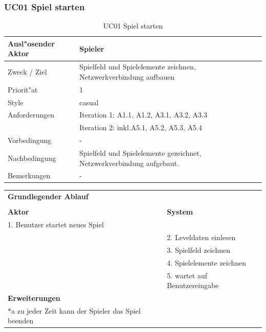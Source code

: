 \subsubsection{UC01 Spiel starten}

\begin{table}[H]
  \begin{center}
    \begin{tabular}{|p{40mm}|p{90mm}|}
    \hline Ausl"osender Aktor & Spieler  \\
    \hline Zweck / Ziel & Spielfeld und Spielelemente zeichnen, Netzwerkverbindung aufbauen  \\
    \hline Priorit"at & 1 \\
    \hline Style & casual \\
    \hline Anforderungen &  Iteration 1: A1.1, A1.2, A3.1, A3.2, A3.3 \\
		                     &  Iteration 2: inkl.A5.1, A5.2, A5.3, A5.4\\
    \hline Vorbedingung & - \\
    \hline Nachbedingung & Spielfeld und Spielelemente gezeichnet, Netzwerkverbindung aufgebaut. \\
    \hline Bemerkungen & - \\
    \hline
    \end{tabular}
  \end{center}
  \caption{UC01 Spiel starten}
\end{table}


\begin{center}
  \begin{tabular}{p{65mm} p{65mm}}
  \multicolumn{2}{l}{\textbf{Grundlegender Ablauf}} \\
  & \\
  \textbf{Aktor} & \textbf{System} \\
  1. Benutzer startet neues Spiel &  \\
  &  2. Leveldaten einlesen  \\
  &  3. Spielfeld zeichnen \\
  &  4. Spielelemente zeichnen \\
  &  5. wartet auf Benutzereingabe\\
  \multicolumn{2}{l}{\textbf{Erweiterungen}} \\
  \(\ast\)a zu jeder Zeit kann der Spieler das Spiel beenden & \\
  \end{tabular}
\end{center}



